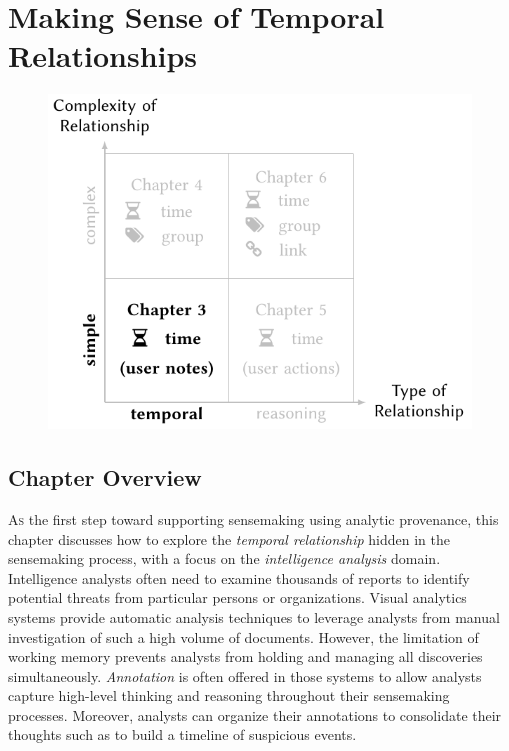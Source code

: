 \chapter{Making Sense of Temporal Relationships}
\label{chap:schemaline}

\graphicspath{{Chapter3/figures/}}

\begin{figure}[!h]
	\centering
	\includegraphics{work}
\end{figure}

\pagebreak

\section{Chapter Overview}
\lettrine{A}{s} the first step toward supporting sensemaking using analytic provenance, this chapter discusses how to explore the \emph{temporal relationship} hidden in the sensemaking process, with a focus on the \emph{intelligence analysis} domain. Intelligence analysts often need to examine thousands of reports to identify potential threats from particular persons or organizations. Visual analytics systems provide automatic analysis techniques to leverage analysts from manual investigation of such a high volume of documents. However, the limitation of working memory prevents analysts from holding and managing all discoveries simultaneously. \emph{Annotation} is often offered in those systems to allow analysts capture high-level thinking and reasoning throughout their sensemaking processes. Moreover, analysts can organize their annotations to consolidate their thoughts such as to build a timeline of suspicious events.

